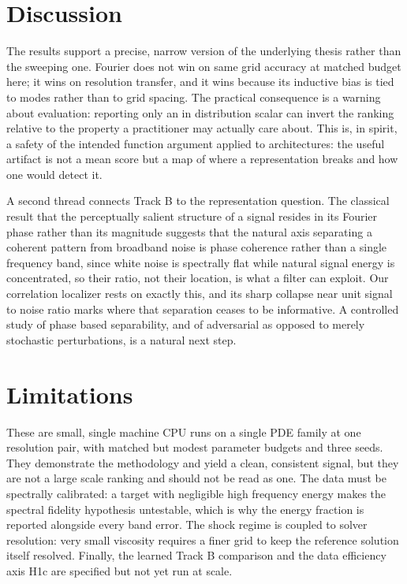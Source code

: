 \documentclass[conference]{IEEEtran}
\begin{document}
\section{Discussion}
The results support a precise, narrow version of the underlying thesis rather than the sweeping one. Fourier does not win on same grid accuracy at matched budget here; it wins on resolution transfer, and it wins because its inductive bias is tied to modes rather than to grid spacing. The practical consequence is a warning about evaluation: reporting only an in distribution scalar can invert the ranking relative to the property a practitioner may actually care about. This is, in spirit, a safety of the intended function argument applied to architectures: the useful artifact is not a mean score but a map of where a representation breaks and how one would detect it.

A second thread connects Track B to the representation question. The classical result that the perceptually salient structure of a signal resides in its Fourier phase rather than its magnitude \cite{oppenheim1981} suggests that the natural axis separating a coherent pattern from broadband noise is phase coherence rather than a single frequency band, since white noise is spectrally flat while natural signal energy is concentrated, so their ratio, not their location, is what a filter can exploit. Our correlation localizer rests on exactly this, and its sharp collapse near unit signal to noise ratio marks where that separation ceases to be informative. A controlled study of phase based separability, and of adversarial as opposed to merely stochastic perturbations, is a natural next step.

\section{Limitations}
These are small, single machine CPU runs on a single PDE family at one resolution pair, with matched but modest parameter budgets and three seeds. They demonstrate the methodology and yield a clean, consistent signal, but they are not a large scale ranking and should not be read as one. The data must be spectrally calibrated: a target with negligible high frequency energy makes the spectral fidelity hypothesis untestable, which is why the energy fraction is reported alongside every band error. The shock regime is coupled to solver resolution: very small viscosity requires a finer grid to keep the reference solution itself resolved. Finally, the learned Track B comparison and the data efficiency axis H1c are specified but not yet run at scale.
\end{document}
